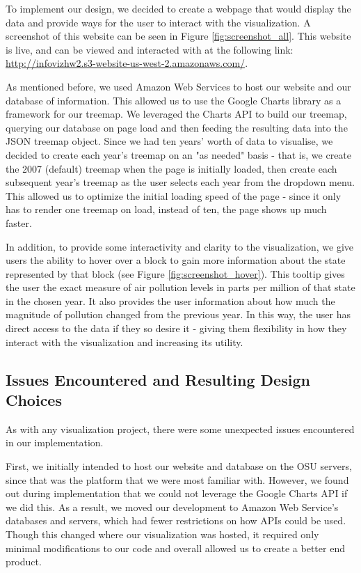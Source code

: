 \documentclass[journal]{vgtc}                %
\begin{document}
To implement our design, we decided to create a webpage that would display the data and provide ways for the user to
interact with the visualization. A screenshot of this website can be seen in Figure \ref{fig:screenshot_all}.
This website is live, and can be viewed and interacted with at the following link:
\url{http://infovizhw2.s3-website-us-west-2.amazonaws.com/}.

As mentioned before, we used Amazon Web Services to host our website and our database of information. This allowed us to
use the Google Charts library as a framework for our treemap. We leveraged the Charts API to build our treemap, querying our
database on page load and then feeding the resulting data into the JSON treemap object. Since we had ten years' worth of data to
visualise, we decided to create each year's treemap on an "as needed" basis - that is, we create the 2007 (default) treemap when the
page is initially loaded, then create each subsequent year's treemap as the user selects each year from the dropdown menu.
This allowed us to optimize the initial loading speed of the page - since it only has to render one treemap on load, instead of
ten, the page shows up much faster.

In addition, to provide some interactivity and clarity to the visualization, we give users the ability to hover over a block to 
gain more information about the state represented by that block (see Figure \ref{fig:screenshot_hover}). This tooltip gives the user the
exact measure of air pollution levels in parts per million of that state in the chosen year. It also provides the user information about
how much the magnitude of pollution changed from the previous year. In this way, the user has direct access to the data if they so desire it - 
giving them flexibility in how they interact with the visualization and increasing its utility.

\subsection{Issues Encountered and Resulting Design Choices}

As with any visualization project, there were some unexpected issues encountered in our implementation. 

First, we initially intended to host our website and database on the OSU servers, since that was the platform that we were
most familiar with. However, we found out during implementation that we could not leverage the Google Charts API if we did
this. As a result, we moved our development to Amazon Web Service's databases and servers, which had fewer restrictions on 
how APIs could be used. Though this changed where our visualization was hosted, it required only minimal modifications to 
our code and overall allowed us to create a better end product.
\end{document}
